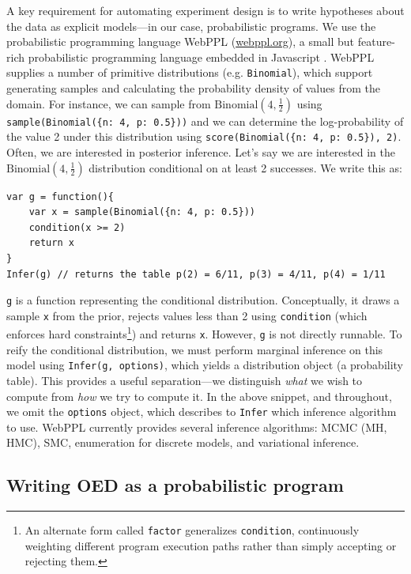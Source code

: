 \documentclass{article}
\begin{document}
A key requirement for automating experiment design is to write hypotheses about the data as explicit models---in our case, probabilistic programs.
We use the probabilistic programming language WebPPL (\url{webppl.org}), a small but feature-rich probabilistic programming language embedded in Javascript \cite{dippl}.
WebPPL supplies a number of primitive distributions (e.g. \lstinline{Binomial}), which support generating samples and calculating the probability density of values from the domain.
For instance, we can sample from $\text{Binomial}(4, \frac{1}{2})$ using \lstinline|sample(Binomial({n: 4, p: 0.5}))| and we can determine the log-probability of the value 2 under this distribution using \lstinline|score(Binomial({n: 4, p: 0.5}), 2)|.
Often, we are interested in posterior inference. Let's say we are interested in the $\text{Binomial}(4, \frac{1}{2})$ distribution conditional on at least 2 successes. We write this as:
\begin{lstlisting}[mathescape, label={code:webppl}]
var g = function(){
	var x = sample(Binomial({n: 4, p: 0.5}))
	condition(x >= 2)
	return x
}
Infer(g) // returns the table p(2) = 6/11, p(3) = 4/11, p(4) = 1/11
\end{lstlisting}
\lstinline{g} is a function representing the conditional distribution.
Conceptually, it draws a sample \lstinline{x} from the prior, rejects values less than 2 using \lstinline{condition} (which enforces hard constraints\footnote{ An alternate form called \lstinline{factor} generalizes \lstinline{condition}, continuously weighting different program execution paths rather than simply accepting or rejecting them.}) and returns \lstinline{x}.
However, \lstinline{g} is not directly runnable.
To reify the conditional distribution, we must perform marginal inference on this model using \lstinline{Infer(g, options)}, which yields a distribution object (a probability table).
This provides a useful separation---we distinguish \emph{what} we wish to compute from \emph{how} we try to compute it.
In the above snippet, and throughout, we omit the \lstinline{options} object, which describes to \lstinline{Infer} which inference algorithm to use. WebPPL currently provides several inference algorithms: MCMC (MH, HMC), SMC, enumeration for discrete models, and variational inference.

\subsection{Writing OED as a probabilistic program}
\end{document}
